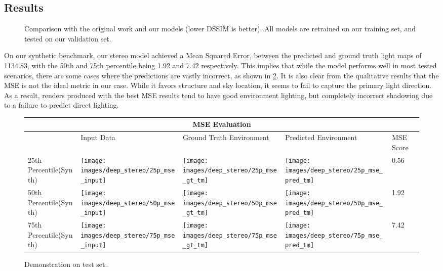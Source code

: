 \documentclass[ %
                    author={Gavin Parker},
                supervisor={Dr. Neill Campbell},
                    degree={MEng},
                     title={Deep Learning for Illumination Estimation from Stereo Images},
                  subtitle={},
                      type={Research},
                      year={2018} ]{dissertation}
\begin{document}
\subsection{Results}
\begin{figure}[H]
\setlength\figureheight{6cm}
\setlength\figurewidth{8cm}
\centering

\caption{Comparison with the original work and our models (lower DSSIM is better). All models are retrained on our training set, and tested on our validation set.}
\label{fig:final_comp}
\end{figure}
On our synthetic benchmark, our stereo model achieved a Mean Squared Error, between the predicted and ground truth light maps of 1134.83, with the 50th and 75th percentile being 1.92 and 7.42 respectively. This implies that while the model performs well in most tested scenarios, there are some cases where the predictions are vastly incorrect, as shown in \ref{tab:mse_results}. It is also clear from the qualitative results that the MSE is not the ideal metric in our case. While it favors structure and sky location, it seems to fail to capture the primary light direction. As a result, renders produced with the best MSE results tend to have good environment lighting, but completely incorrect shadowing due to a failure to predict direct lighting.
\newline
\begin{figure}[H]
\centering
\begin{tabular}{ |p{3cm}||p{3cm}|p{3cm}|p{3cm}|p{3cm}|  }
 \hline
 \multicolumn{5}{|c|}{MSE Evaluation} \\
 \hline
  & Input Data &Ground Truth Environment&Predicted Environment&MSE Score\\
 \hline
 25th Percentile(Synth)&\parbox[c]{1em}{
 \texttt{[image: images/deep\_stereo/25p\_mse\_input]}}&\parbox[c]{1em}{\texttt{[image: images/deep\_stereo/25p\_mse\_gt\_tm]}}&
\parbox[c]{1em}{\texttt{[image: images/deep\_stereo/25p\_mse\_pred\_tm]}}& 0.56\\
 50th Percentile(Synth)&\parbox[c]{1em}{
 \texttt{[image: images/deep\_stereo/50p\_mse\_input]}}&\parbox[c]{1em}{\texttt{[image: images/deep\_stereo/50p\_mse\_gt\_tm]}}&
\parbox[c]{1em}{\texttt{[image: images/deep\_stereo/50p\_mse\_pred\_tm]}}& 1.92\\
 75th Percentile(Synth)&\parbox[c]{1em}{
 \texttt{[image: images/deep\_stereo/75p\_mse\_input]}}&\parbox[c]{1em}{\texttt{[image: images/deep\_stereo/75p\_mse\_gt\_tm]}}&
\parbox[c]{1em}{\texttt{[image: images/deep\_stereo/75p\_mse\_pred\_tm]}}& 7.42\\
 \hline
\end{tabular}

\caption{Demonstration on test set.}
\label{tab:mse_results}

\end{figure}
\end{document}
